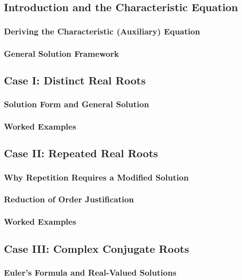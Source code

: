 \documentclass[10pt]{article}
\begin{document}
\subsection{Introduction and the Characteristic Equation}
    \subsubsection{Deriving the Characteristic (Auxiliary) Equation}
    \subsubsection{General Solution Framework}

\subsection{Case I: Distinct Real Roots}
    \subsubsection{Solution Form and General Solution}
    \subsubsection{Worked Examples}

\subsection{Case II: Repeated Real Roots}
    \subsubsection{Why Repetition Requires a Modified Solution}
    \subsubsection{Reduction of Order Justification}
    \subsubsection{Worked Examples}

\subsection{Case III: Complex Conjugate Roots}
    \subsubsection{Euler's Formula and Real-Valued Solutions}
\end{document}
